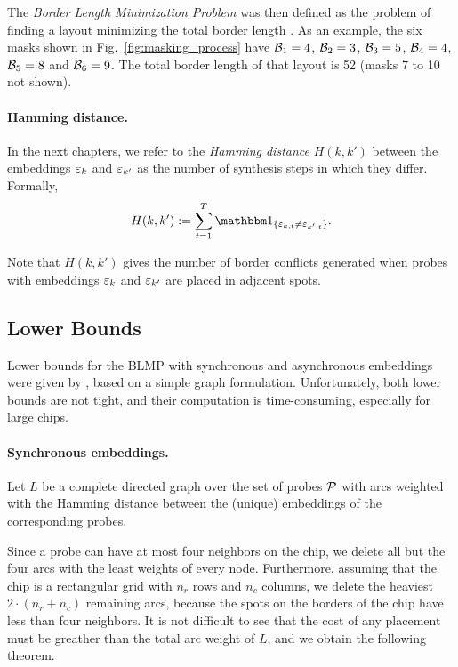 The \emph{Border Length Minimization Problem} was then defined as the problem of
finding a layout minimizing the total border length \citep{Hannenhalli2002}. As
an example, the six masks shown in Fig.~\ref{fig:masking_process} have
${\mathcal{B}}_1 = 4$, ${\mathcal{B}}_2 = 3$, ${\mathcal{B}}_3 = 5$, ${\mathcal{B}}_4 = 4$, ${\mathcal{B}}_5 = 8$ and
${\mathcal{B}}_6 = 9$. The total border length of that layout is 52 (masks 7 to 10 not
shown).

\paragraph{Hamming distance.}
In the next chapters, we refer to the \emph{Hamming distance} $H(k,k')$ between
the embeddings $\varepsilon_k$ and $\varepsilon_{k'}$ as the number of synthesis steps in
which they differ. Formally,
\begin{equation}\label{eq:hamming}
  H(k,k') := \sum_{t=1}^{T} \Ind{\eps_{k,t} \neq \eps_{k',t}}.
\end{equation}

Note that $H(k,k')$ gives the number of border conflicts generated when probes
with embeddings $\varepsilon_k$ and $\varepsilon_{k'}$ are placed in adjacent spots.

\subsection{Lower Bounds}

Lower bounds for the BLMP with synchronous and asynchronous embeddings were
given by \citet{Kahng2002}, based on a simple graph formulation. Unfortunately,
both lower bounds are not tight, and their computation is time-consuming,
especially for large chips.

\paragraph{Synchronous embeddings.}
Let $L$ be a complete directed graph over the set of probes ${\mathcal{P}}$ with arcs
weighted with the Hamming distance between the (unique) embeddings of the
corresponding probes.

Since a probe can have at most four neighbors on the chip, we delete all but the
four arcs with the least weights of every node. Furthermore, assuming that the
chip is a rectangular grid with $n_r$ rows and $n_c$ columns, we delete the
heaviest $2 \cdot (n_r + n_c)$ remaining arcs, because the spots on the borders
of the chip have less than four neighbors. It is not difficult to see that the
cost of any placement must be greather than the total arc weight of $L$, and we
obtain the following theorem.

